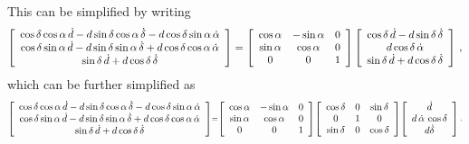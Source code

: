 This can be simplified by writing
\begin{equation}\label{eq:simplifyddtradec2}
\left[  \begin{array}{c} 
\cos \delta \cos \alpha\, \dot{d} - d \sin \delta \cos \alpha\, \dot{\delta} - d \cos \delta \sin \alpha\, \dot{\alpha}
\\ \cos \delta \sin \alpha\, \dot{d} - d \sin \delta \sin \alpha\, \dot{\delta} + d \cos \delta \cos \alpha\, \dot{\alpha} 
\\ \sin \delta\, \dot{d} + d \cos \delta\, \dot{\delta} \end{array} \right]= 
\left[ \begin{array}{ccc} \cos \alpha & -\sin \alpha & 0 \\ \sin \alpha & \cos \alpha & 0 \\ 0 & 0& 1 \end{array} \right]
\left[ \begin{array}{c} \cos \delta \, \dot{d} - d \sin \delta \, \dot{\delta} \\
d \cos \delta\, \dot{\alpha}\\
\sin\delta \, \dot{d} + d \cos\delta\, \dot{\delta} \end{array} \right] \, ,
\end{equation}
which can be further simplified as
\begin{equation}\scriptstyle\label{eq:simplifyddtradec3}
\left[  \begin{array}{c} 
\cos \delta \cos \alpha\, \dot{d} - d \sin \delta \cos \alpha\, \dot{\delta} - d \cos \delta \sin \alpha\, \dot{\alpha}
\\ \cos \delta \sin \alpha\, \dot{d} - d \sin \delta \sin \alpha\, \dot{\delta} + d \cos \delta \cos \alpha\, \dot{\alpha} 
\\ \sin \delta\, \dot{d} + d \cos \delta\, \dot{\delta} \end{array} \right]= 
\left[ \begin{array}{ccc} \cos \alpha & -\sin \alpha & 0 \\ \sin \alpha & \cos \alpha & 0 \\ 0 & 0 & 1 \end{array} \right]
\left[ \begin{array}{ccc} \cos \delta & 0 & \sin \delta\\ 0 & 1 & 0 \\ \sin \delta  & 0 & \cos\delta\end{array} \right]
\left[ \begin{array}{c} \dot{d} \\ d\,\dot{\alpha}\,\cos\delta\\d\dot{\delta}\end{array} \right]\, .
\end{equation}
